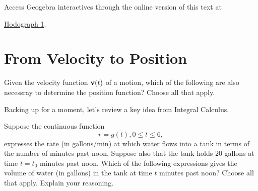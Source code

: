 \documentclass{ximera}
\begin{document}
\begin{exploration}
\begin{onlineOnly}
    \begin{center}
\end{center}
\end{onlineOnly}


Access Geogebra interactives through the online version of this text at

 
\href{https://www.geogebra.org/classic/jdsf9ttr}{Hodograph 1}.

\end{exploration}




\begin{exploration}
 
\begin{onlineOnly}
    \begin{center}
\end{center}
\end{onlineOnly}
\end{exploration}


\section{From Velocity to Position}


\begin{question}  \label{Qdst65nvcy}
Given the velocity function ${\bf v}(t)$ of a motion, which of the following are also necessray to determine the position function? Choose all that apply.
\begin{selectAll}  
  \end{selectAll}
\end{question}


Backing up for a moment, let's review a key idea from Integral Calculus.
\begin{question}  \label{Qddggt5t6vcy}
Suppose the continuous function 
\[
    r=g(t) , 0\leq t \leq 6 ,
\]
expresses the rate (in gallons/min) at which water flows into a tank in terms of the number of minutes past noon. Suppose also that the tank holds $20$ gallons at time $t=t_0$ minutes past noon. Which of the following expressions gives the volume of water (in gallons) in the tank at time $t$ minutes past noon? Choose all that apply. Explain your reasoning.
\begin{selectAll}  
  \end{selectAll}
\end{question}
\end{document}
